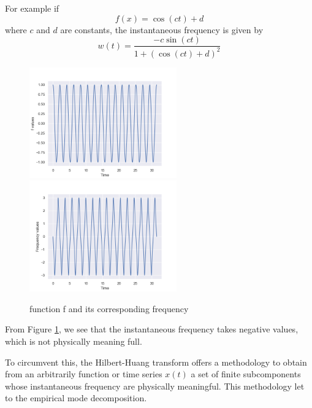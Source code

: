 \documentclass[11pt, oneside]{article}   	%
\begin{document}
\begin{flushleft}
\begin{flushleft} 
For example if 
\begin{equation}
f(x) = \cos(ct) +d 
\end{equation}
where $c$ and $d$ are constants, the instantaneous frequency is given by
\begin{equation}
w(t) = \frac{-c\sin(ct)}{1+(\cos(ct) +d)^{2} }
\end{equation}
\begin{figure}[H] %
   \centering
   \includegraphics[width=2.5in]{f} 
     \includegraphics[width=2.5in]{frequency} 
   \caption{function f and its corresponding frequency}
   \label{fig:freq}
\end{figure}
From Figure \ref{fig:freq}, we see that the instantaneous frequency takes negative values, which is not physically meaning full. 
\end{flushleft}

\begin{flushleft}
To circumvent this, the Hilbert-Huang transform offers a methodology to obtain from an arbitrarily function or time series $x(t)$ a set of finite subcomponents whose instantaneous frequency are physically meaningful. This methodology let to the empirical mode decomposition.
\end{flushleft}



\end{flushleft}
\end{document}
